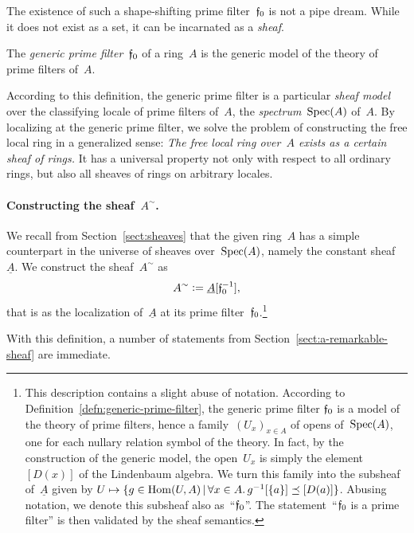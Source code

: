 \documentclass{ws-rv9x6}
\begin{document}
{The existence of such a shape-shifting prime filter~$\mathfrak{f}_0$ is not a pipe dream.
While it does not exist as a set, it can be incarnated as a \emph{sheaf}.

\begin{definition}\label{defn:generic-prime-filter}
The \emph{generic prime filter}~$\mathfrak{f}_0$ of a ring~$A$ is the
generic model of the theory of prime filters of~$A$.\end{definition}

According to this definition, the generic prime filter is a particular
\emph{sheaf model} over the classifying locale of prime filters of~$A$, the
\emph{spectrum}~$\mathrm{Spec}(A)$ of~$A$. By localizing at the generic prime filter, we solve
the problem of constructing the free local ring in a generalized sense: \emph{The
free local ring over~$A$ exists as a certain sheaf of rings.} It has a
universal property not only with respect to all ordinary rings, but also all
sheaves of rings on arbitrary locales.

\paragraph{Constructing the sheaf~$A^\sim$.} We recall from Section~\ref{sect:sheaves} that the given ring~$A$
has a simple counterpart in the universe of sheaves over~$\mathrm{Spec}(A)$, namely the
constant sheaf~$\underline{A}$. We construct the sheaf~$A^\sim$ as
\[ A^\sim \vcentcolon= \underline{A}[\mathfrak{f}_0^{-1}], \]
that is as the localization of~$\underline{A}$ at its prime
filter~$\mathfrak{f}_0$.\footnote{This description contains a slight abuse of notation.
According to Definition~\ref{defn:generic-prime-filter}, the generic prime
filter $\mathfrak{f}_0$ is a model of the theory of prime filters, hence a
family~$(U_x)_{x \in A}$ of opens of~$\mathrm{Spec}(A)$, one for each nullary relation
symbol of the theory. In fact, by the construction of the generic model, the
open~$U_x$ is simply the element~$[D(x)]$ of the Lindenbaum algebra. We
turn this family into the subsheaf of~$\underline{A}$ given by $U \mapsto \{ g
\in \mathrm{Hom}(U,A) \,|\, \forall x \in A\mathpunct{.} g^{-1}[\{a\}] \preceq [D(a)] \}$. Abusing
notation, we denote this subsheaf also as~``$\mathfrak{f}_0$''. The
statement~``$\mathfrak{f}_0$ is a prime filter'' is then validated by the sheaf semantics.}

With this definition, a number of statements from
Section~\ref{sect:a-remarkable-sheaf} are immediate.

}
\end{document}
